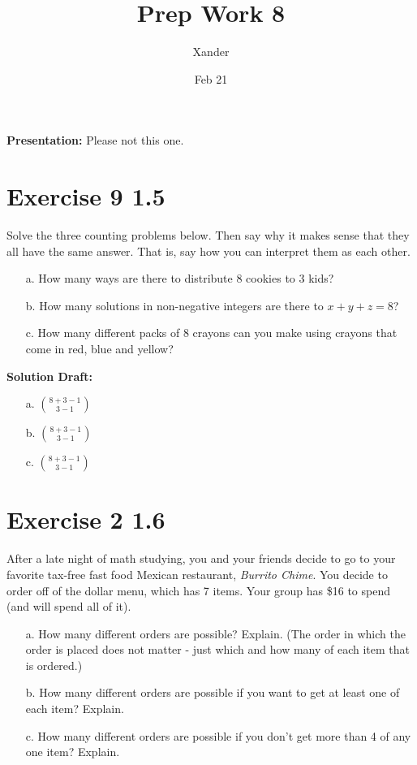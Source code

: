 \documentclass{article}
\title{Prep Work 8}
\author{Xander}
\date{Feb 21}
\begin{document}
\maketitle
\noindent\textbf{Presentation:} Please not this one. 

\section*{Exercise 9 1.5}  


Solve the three counting problems below. Then say why it makes sense that they all have the same answer. That is, say how you can interpret them as each other.
\begin{enumerate}
    \item[a.] How many ways are there to distribute 8 cookies to 3 kids?
    \item[b.] How many solutions in non-negative integers are there to \(x + y + z = 8\)?
    \item[c.] How many different packs of 8 crayons can you make using crayons that come in red, blue and yellow?
\end{enumerate}

\vspace{0.5cm}
\noindent\textbf{Solution Draft:} 
\vspace{0.2cm}

\begin{enumerate}
    \item[a.] \( \binom{8 + 3 - 1}{3 - 1} \)
    \item[b.] \( \binom{8 + 3 - 1}{3 - 1} \)
    \item[c.] \( \binom{8 + 3 - 1}{3 - 1} \)
\end{enumerate}

\section*{Exercise 2 1.6}  

After a late night of math studying, you and your friends decide to go to your favorite tax-free fast food Mexican restaurant, \textit{Burrito Chime}. You decide to order off of the dollar menu, which has 7 items. Your group has \$16 to spend (and will spend all of it).
\begin{enumerate}
    \item[a.] How many different orders are possible? Explain. (The order in which the order is placed does not matter - just which and how many of each item that is ordered.)
    \item[b.] How many different orders are possible if you want to get at least one of each item? Explain.
    \item[c.] How many different orders are possible if you don't get more than 4 of any one item? Explain.
\end{enumerate}
\end{document}
